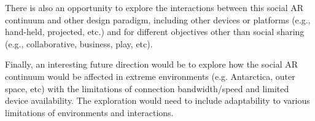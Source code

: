 There is also an opportunity to explore the interactions between this social AR continuum and other design paradigm, including other devices or platforms (e.g., hand-held, projected, etc.) and for different objectives other than social sharing (e.g., collaborative, business, play, etc).

Finally, an interesting future direction would be to explore how the social AR continuum would be affected in extreme environments (e.g. Antarctica, outer space, etc) with the limitations of connection bandwidth/speed and limited device availability. The exploration would need to include adaptability to various limitations of environments and interactions. 

